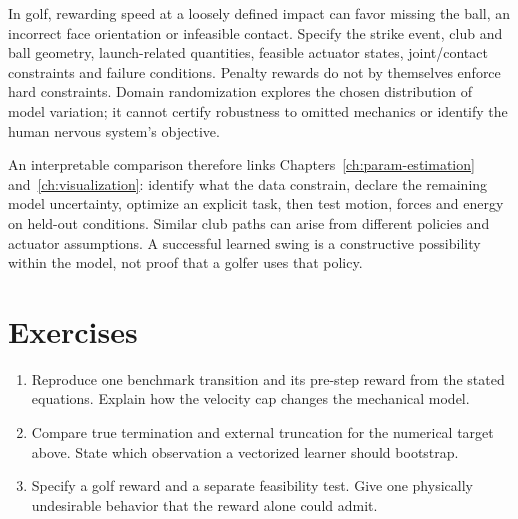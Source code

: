 In golf, rewarding speed at a loosely defined impact can favor missing the
ball, an incorrect face orientation or infeasible contact. Specify the strike
event, club and ball geometry, launch-related quantities, feasible actuator
states, joint/contact constraints and failure conditions. Penalty rewards do
not by themselves enforce hard constraints. Domain randomization explores the
chosen distribution of model variation; it cannot certify robustness to omitted
mechanics or identify the human nervous system's objective.

An interpretable comparison therefore links Chapters~\ref{ch:param-estimation}
and~\ref{ch:visualization}: identify what the data constrain, declare the
remaining model uncertainty, optimize an explicit task, then test motion,
forces and energy on held-out conditions. Similar club paths can arise from
different policies and actuator assumptions. A successful learned swing is a
constructive possibility within the model, not proof that a golfer uses that
policy.

\section*{Exercises}
\begin{enumerate}
  \item Reproduce one benchmark transition and its pre-step reward from the
  stated equations. Explain how the velocity cap changes the mechanical model.
  \item Compare true termination and external truncation for the numerical
  target above. State which observation a vectorized learner should bootstrap.
  \item Specify a golf reward and a separate feasibility test. Give one
  physically undesirable behavior that the reward alone could admit.
\end{enumerate}
